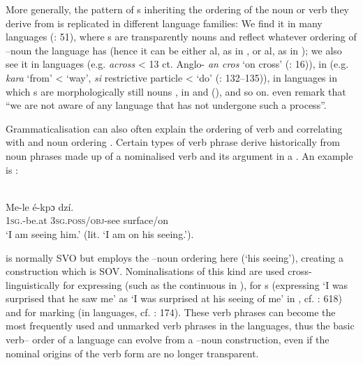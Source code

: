\documentclass[output=paper]{langsci/langscibook}
\begin{document}
More generally, the pattern of s inheriting the ordering of the noun or verb they derive from is replicated in different language families: We find it in many  languages (\citealt{LynchEtAl2002}: 51), where s are transparently nouns and reflect whatever ordering of –noun the language has (hence it can be either al, as in , or al, as in ); we also see it in  languages (e.g.  \textit{across} < 13 ct. Anglo- \textit{an cros} ‘on cross’ (\citealt{BordetJamet2010}: 16)), in  (e.g. \textit{kara} ‘from’ < ‘way’, \textit{si} restrictive particle < ‘do’ (\citealt{Frellesvig2010}: 132–135)), in  languages in which s are morphologically still nouns \citep{Dixon2002}, in  and  (\citealt{DeLancey1997}), and so on. \citet[62]{HeineKuteva2007} even remark that “we are not aware of any language that has not undergone such a process”.

Grammaticalisation can also often explain the ordering of verb and  correlating with  and noun ordering \citep{Dryer2011}. Certain types of verb phrase derive historically from noun phrases made up of a nominalised verb and its  argument in a . An example is :

\ea

\\
\gll Me-le       é-kpɔ     dzí.\\
     \textsc{1sg}.-be.at  3\textsc{sg.poss/obj-}see   surface/on\\
\glt ‘I am seeing him.’ (lit. ‘I am on his seeing.’).
\z

 is normally SVO but employs the –noun ordering here (‘his seeing’), creating a construction which is SOV. Nominalisations of this kind are used cross-linguistically for expressing  (such as the continuous  in ), for s (expressing ‘I was surprised that he saw me’ as ‘I was surprised at his seeing of me’ in , cf. \citealt{Ogloblin2005}: 618) and for  marking (in  languages, cf. \citealt{Himmelmann2005}: 174). These verb phrases can become the most frequently used and unmarked verb phrases in the languages, thus the basic verb– order of a language can evolve from a –noun construction, even if the nominal origins of the verb form are no longer transparent. 
\end{document}
